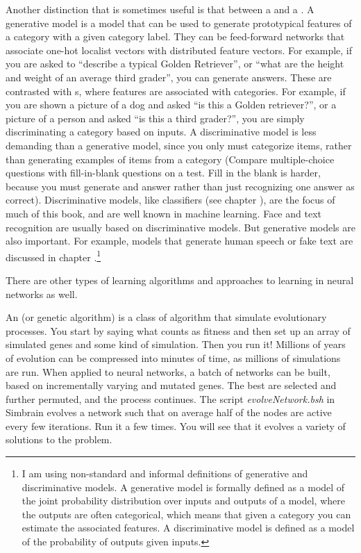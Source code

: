 Another distinction that is sometimes useful is that between a  and a . A generative model is a model that can be used to generate prototypical features of a category with a given category label. They can be feed-forward networks that associate one-hot localist vectors with distributed feature vectors. For example, if you are asked to ``describe a typical Golden Retriever'', or ``what are the height and weight of an average third grader'', you can generate answers. These are contrasted with s, where features are associated with categories. For example, if you are shown a picture of a dog and asked ``is this a Golden retriever?'', or a picture of a person and asked ``is this a third grader?'', you are simply discriminating a category based on inputs.  A discriminative model is less demanding than a generative model, since you only must categorize items, rather than generating examples of items from a category (Compare multiple-choice questions with fill-in-blank questions on a test. Fill in the blank is harder, because you must generate and answer rather than just recognizing one answer as correct). Discriminative models, like classifiers (see chapter ), are the focus of much of this book, and are well known in machine learning. Face and text recognition are usually based on discriminative models.  But generative models are also important. For example, models that generate human speech or fake text are discussed in chapter .\footnote{I am using non-standard and informal definitions of generative and discriminative models. A generative model is formally defined as a model of the joint probability distribution over inputs and outputs of a model, where the outputs are often categorical, which means that given a category you can estimate the associated features. A discriminative model is defined as a model of the probability of outputs given inputs.} 

There are other types of learning algorithms and approaches to learning in neural networks as well.

An  (or genetic algorithm) is a class of algorithm that simulate evolutionary processes. You start by saying what counts as fitness and then set up an array of simulated genes and some kind of simulation. Then you run it!  Millions of years of evolution can be compressed into minutes of time, as millions of simulations are run. When applied to neural networks, a batch of networks can be built, based on incrementally varying and mutated genes. The best are selected and further permuted, and the process continues. The script \emph{evolveNetwork.bsh} in Simbrain evolves a network such that on average half of the nodes are active every few iterations. Run it a few times. You will see that it evolves a variety of solutions to the problem.

